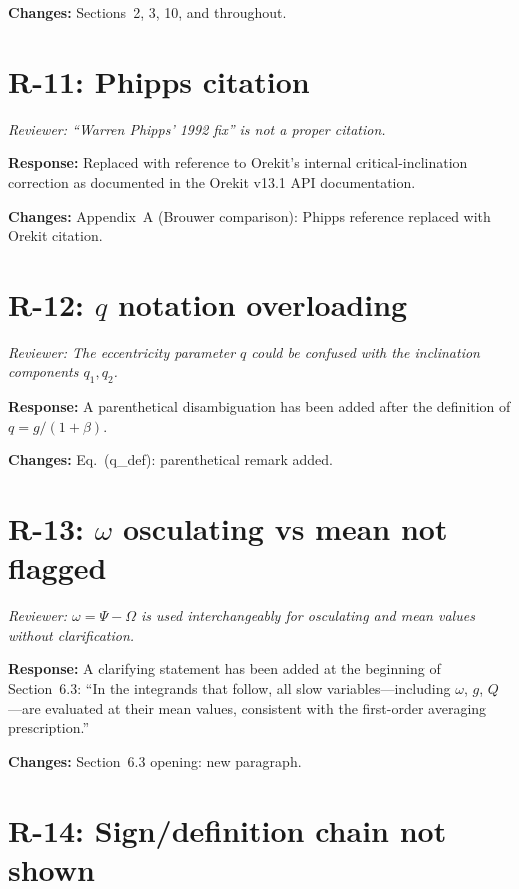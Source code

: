 \documentclass[11pt]{article}
\newcommand{\rev}[1]{\textcolor{revcolor}{\emph{#1}}}
\begin{document}
\textbf{Changes:} Sections~2, 3, 10, and throughout.

\section*{R-11: Phipps citation}

\rev{Reviewer: ``Warren Phipps' 1992 fix'' is not a proper citation.}

\textbf{Response:} Replaced with reference to Orekit's internal
critical-inclination correction as documented in the Orekit v13.1 API
documentation.

\textbf{Changes:} Appendix~A (Brouwer comparison): Phipps reference
replaced with Orekit citation.

\section*{R-12: $q$ notation overloading}

\rev{Reviewer: The eccentricity parameter $q$ could be confused with the
inclination components $q_1, q_2$.}

\textbf{Response:} A parenthetical disambiguation has been added after the
definition of $q = g/(1+\beta)$.

\textbf{Changes:} Eq.~(q\_def): parenthetical remark added.

\section*{R-13: $\omega$ osculating vs mean not flagged}

\rev{Reviewer: $\omega = \Psi - \Omega$ is used interchangeably for
osculating and mean values without clarification.}

\textbf{Response:} A clarifying statement has been added at the beginning of
Section~6.3: ``In the integrands that follow, all slow variables---including
$\omega$, $g$, $Q$---are evaluated at their mean values, consistent with the
first-order averaging prescription.''

\textbf{Changes:} Section~6.3 opening: new paragraph.

\section*{R-14: Sign/definition chain not shown}
\end{document}
